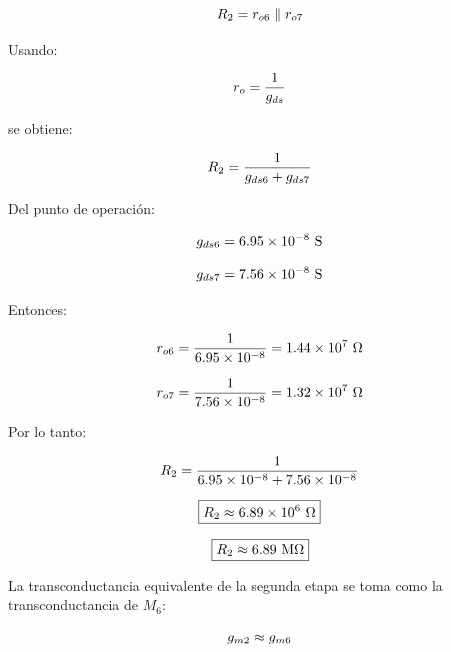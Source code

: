 \begin{equation}\notag
R_2=r_{o6}\parallel r_{o7}
\end{equation}

Usando:

\begin{equation}\notag
r_o=\frac{1}{g_{ds}}
\end{equation}

se obtiene:

\begin{equation}\notag
R_2=
\frac{1}{g_{ds6}+g_{ds7}}
\end{equation}

Del punto de operación:

\begin{equation}\notag
g_{ds6}=6.95\times 10^{-8}\ \mathrm{S}
\end{equation}

\begin{equation}\notag
g_{ds7}=7.56\times 10^{-8}\ \mathrm{S}
\end{equation}

Entonces:

\begin{equation}\notag
r_{o6}=
\frac{1}{6.95\times 10^{-8}}
=
1.44\times 10^{7}\ \Omega
\end{equation}

\begin{equation}\notag
r_{o7}=
\frac{1}{7.56\times 10^{-8}}
=
1.32\times 10^{7}\ \Omega
\end{equation}

Por lo tanto:

\begin{equation}\notag
R_2=
\frac{1}{6.95\times 10^{-8}+7.56\times 10^{-8}}
\end{equation}

\begin{equation}\notag
\boxed{
R_2\approx 6.89\times 10^{6}\ \Omega
}
\end{equation}

\begin{equation}\notag
\boxed{
R_2\approx 6.89\ \mathrm{M\Omega}
}
\end{equation}

La transconductancia equivalente de la segunda etapa se toma como la transconductancia de \(M_6\):

\begin{equation}\notag
g_{m2}\approx g_{m6}
\end{equation}

